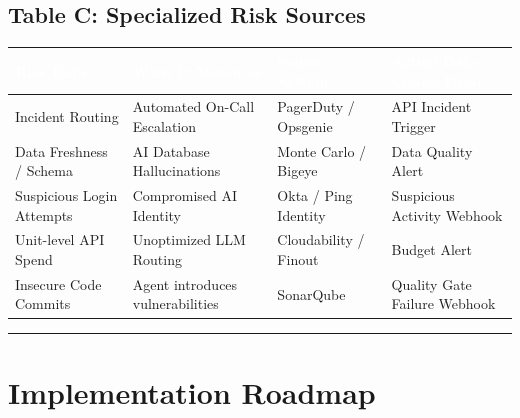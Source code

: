 \documentclass[11pt,a4paper]{article}
\begin{document}
\subsection{Table C: Specialized Risk Sources}
\begin{table}[H]
\centering
\renewcommand{\arraystretch}{1.4}
\small
{}
\begin{tabularx}{\textwidth}{| >{\raggedright\arraybackslash}X >{\raggedright\arraybackslash}X >{\raggedright\arraybackslash}p{3cm} >{\raggedright\arraybackslash}X |}
\hline
\rowcolor{dpigreen!80} \textcolor{white}{\textbf{Risk Data}} & \textcolor{white}{\textbf{What It Measures}} & \textcolor{white}{\textbf{Source System}} & \textcolor{white}{\textbf{Actual Data Comes From}} \\
\hline
Incident Routing & Automated On-Call Escalation & PagerDuty / Opsgenie & API Incident Trigger \\
Data Freshness / Schema & AI Database Hallucinations & Monte Carlo / Bigeye & Data Quality Alert \\
Suspicious Login Attempts & Compromised AI Identity & Okta / Ping Identity & Suspicious Activity Webhook \\
Unit-level API Spend & Unoptimized LLM Routing & Cloudability / Finout & Budget Alert \\
Insecure Code Commits & Agent introduces vulnerabilities & SonarQube & Quality Gate Failure Webhook \\
\hline
\end{tabularx}
\end{table}

\vspace{0.5cm}
\hrule
\vspace{0.5cm}

\section{Implementation Roadmap}
\end{document}
